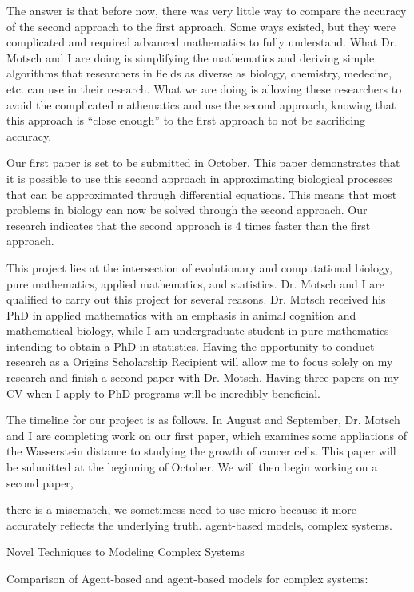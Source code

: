 \documentclass[8 pt, leqno]{article}
\begin{document}
The answer is that before now, there was very little way to compare the accuracy of the second approach to the first approach. Some ways existed, but they were complicated and required advanced mathematics to fully understand. What Dr. Motsch and I are doing is simplifying the mathematics and deriving simple algorithms that researchers in fields as diverse as biology, chemistry, medecine, etc. can use in their research. What we are doing is allowing these researchers to avoid the complicated mathematics and use the second approach, knowing that this approach is ``close enough'' to the first approach to not be sacrificing accuracy. 

Our first paper is set to be submitted in October. This paper demonstrates that it is possible to use this second approach in approximating biological processes that can be approximated through differential equations. This means that most problems in biology can now be solved through the second approach. Our research indicates that the second approach is 4 times faster than the first approach.

This project lies at the intersection of evolutionary and computational biology, pure mathematics, applied mathematics, and statistics. Dr. Motsch and I are qualified to carry out this project for several reasons. Dr. Motsch received his PhD in applied mathematics with an emphasis in animal cognition and mathematical biology, while I am undergraduate student in pure mathematics intending to obtain a PhD in statistics. Having the opportunity to conduct research as a Origins Scholarship Recipient will allow me to focus solely on my research and finish a second paper with Dr. Motsch. Having three papers on my CV when I apply to PhD programs will be incredibly beneficial. 

The timeline for our project is as follows. In August and September, Dr. Motsch and I are completing work on our first paper, which examines some appliations of the Wasserstein distance to studying the growth of cancer cells. This paper will be submitted at the beginning of October. We will then begin working on a second paper, 


there is a miscmatch, we sometimess need to use micro because it more accurately reflects the underlying truth. agent-based models, complex systems. 

Novel Techniques to Modeling Complex Systems 

Comparison of Agent-based and   
agent-based models for complex systems: 
\end{document}
